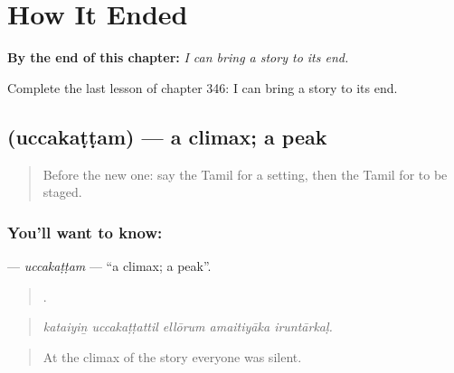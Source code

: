 
\chapter{How It Ended}
\label{ch:ta-how-it-ended}

\begin{chapteropening}
\textbf{By the end of this chapter:} \emph{I can bring a story to its end.}

Complete the last lesson of chapter 346: I can bring a story to its end.
\end{chapteropening}

\section[\texorpdfstring{\ta{உச்சகட்டம்} (uccakaṭṭam)}{உச்சகட்டம் (uccakaṭṭam)}]{ (uccakaṭṭam) — a climax; a peak}

\label{lesson:TA-C346-uccakattam}



\begin{quote}
Before the new one: say the Tamil for a setting, then the Tamil for to be staged.
\end{quote}

\subsection*{You'll want to know: }
\textbf{} — \emph{uccakaṭṭam} — \textquotedblleft{}a climax; a peak\textquotedblright{}.

\begin{quote}
    .
\end{quote}

\begin{quote}
\emph{kataiyiṉ uccakaṭṭattil ellōrum amaitiyāka iruntārkaḷ.}
\end{quote}

\begin{quote}
At the climax of the story everyone was silent.
\end{quote}

